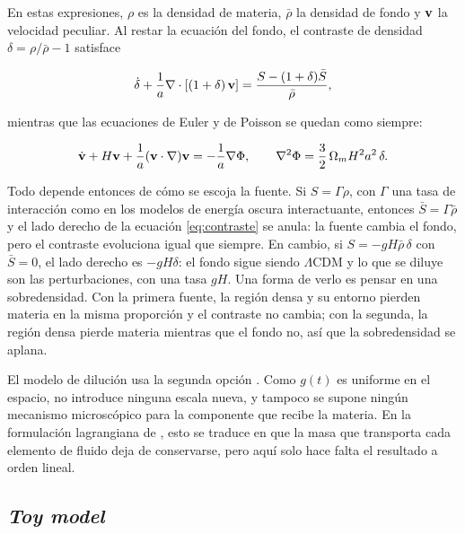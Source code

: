 \documentclass[letterpaper, 12pt]{article}
\newcommand{\LCDM}{\Lambda\mathrm{CDM}}
\begin{document}
            En estas expresiones, $\rho$ es la densidad de materia, $\bar\rho$ la densidad de fondo y $\vb{v}$ la velocidad peculiar. Al restar la ecuación del fondo, el contraste de densidad $\delta = \rho/\bar\rho - 1$ satisface

            \begin{equation}\label{eq:contraste}
                \dot\delta + \frac{1}{a}\nabla\cdot\qty[(1+\delta)\,\vb{v}] = \frac{S - (1+\delta)\bar S}{\bar\rho},
            \end{equation}

            mientras que las ecuaciones de Euler y de Poisson se quedan como siempre:

            \begin{equation}\label{eq:euler_poisson}
                \dot{\vb{v}} + H\vb{v} + \frac{1}{a}(\vb{v}\cdot\nabla)\vb{v} = -\frac{1}{a}\nabla\Phi, \qquad
                \nabla^2\Phi = \frac{3}{2}\,\Omega_m H^2 a^2\,\delta.
            \end{equation}

            Todo depende entonces de cómo se escoja la fuente. Si $S = \Gamma\rho$, con $\Gamma$ una tasa de interacción como en los modelos de energía oscura interactuante, entonces $\bar S = \Gamma\bar\rho$ y el lado derecho de la ecuación \eqref{eq:contraste} se anula: la fuente cambia el fondo, pero el contraste evoluciona igual que siempre. En cambio, si $S = -gH\bar\rho\,\delta$ con $\bar S = 0$, el lado derecho es $-gH\delta$: el fondo sigue siendo $\LCDM$ y lo que se diluye son las perturbaciones, con una tasa $gH$. Una forma de verlo es pensar en una sobredensidad. Con la primera fuente, la región densa y su entorno pierden materia en la misma proporción y el contraste no cambia; con la segunda, la región densa pierde materia mientras que el fondo no, así que la sobredensidad se aplana.

            El modelo de dilución usa la segunda opción \cite{aviles_ferrara}. Como $g(t)$ es uniforme en el espacio, no introduce ninguna escala nueva, y tampoco se supone ningún mecanismo microscópico para la componente que recibe la materia. En la formulación lagrangiana de \cite{aviles_ferrara}, esto se traduce en que la masa que transporta cada elemento de fluido deja de conservarse, pero aquí solo hace falta el resultado a orden lineal.

        \subsection{\texorpdfstring{\emph{Toy model}}{Toy model}}
\end{document}
